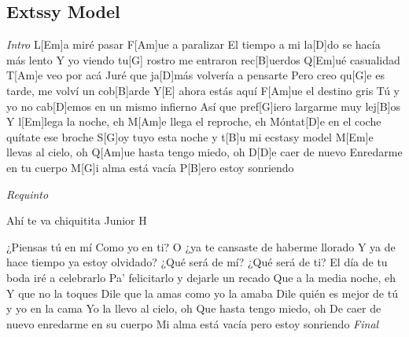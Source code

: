 \subsection{Extssy Model}
\noindent

\vspace{1cm}

\begin{guitar}
	\begin{multicols}{2}

		\textit{Intro}
		L[Em]a miré pasar
		F[Am]ue a paralizar
		El tiempo a mi la[D]do se hacía más lento
		Y yo viendo tu[G] rostro me entraron rec[B]uerdos
		Q[Em]ué casualidad
		T[Am]e veo por acá
		Juré que ja[D]más volvería a pensarte
		Pero creo qu[G]e es tarde, me volví un cob[B]arde
		Y[E] ahora estás aquí
		F[Am]ue el destino gris
		Tú y yo no cab[D]emos en un mismo infierno
		Así que pref[G]iero largarme muy lej[B]os
		Y l[Em]lega la noche, eh
		M[Am]e llega el reproche, eh
		Móntat[D]e en el coche quítate ese broche
		S[G]oy tuyo esta noche y t[B]u mi ecstasy model
		M[Em]e llevas al cielo, oh
		Q[Am]ue hasta tengo miedo, oh
		D[D]e caer de nuevo
	Enredarme en tu cuerpo
	M[G]i alma está vacía
	P[B]ero estoy sonriendo
	\par
	\textit{Requinto}
	\par
	Ahí te va chiquitita
	Junior H
	\par
	¿Piensas tú en mí
	Como yo en ti?
	O ¿ya te cansaste de haberme llorado
	Y ya de hace tiempo ya estoy olvidado?
	¿Qué será de mí?
	¿Qué será de ti?
	El día de tu boda iré a celebrarlo
	Pa' felicitarlo y dejarle un recado
	Que a la media noche, eh
	Y que no la toques
	Dile que la amas como yo la amaba
	Dile quién es mejor de tú y yo en la cama
	Yo la llevo al cielo, oh
	Que hasta tengo miedo, oh
	De caer de nuevo enredarme en su cuerpo
	Mi alma está vacía pero estoy sonriendo
		\textit{Final}

	\end{multicols}
\end{guitar}
